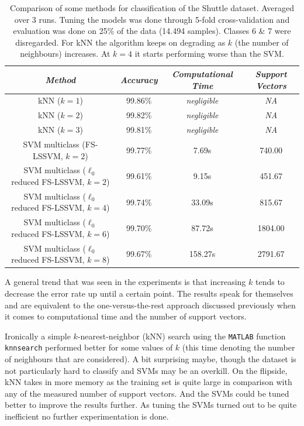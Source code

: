 \begin{table}[htb]
\centering
\begin{tabular}{c|ccc}
\textit{Method} & \textit{Accuracy} & \textit{Computational Time} & \textit{Support Vectors} \\\hline
kNN ($k=1$) & 99.86\% & \textit{negligible} & \textit{NA} \\
kNN ($k=2$) & 99.82\% & \textit{negligible} & \textit{NA} \\
kNN ($k=3$) & 99.81\% & \textit{negligible} & \textit{NA} \\
SVM multiclass (FS-LSSVM, $k=2$) & 99.77\% & 7.69s & 740.00 \\
SVM multiclass ($\ell_0$ reduced FS-LSSVM, $k=2$) & 99.61\% & 9.15s & 451.67 \\
SVM multiclass ($\ell_0$ reduced FS-LSSVM, $k=4$) & 99.74\% & 33.09s & 815.67 \\
SVM multiclass ($\ell_0$ reduced FS-LSSVM, $k=6$) & 99.70\% & 87.72s & 1804.00 \\
SVM multiclass ($\ell_0$ reduced FS-LSSVM, $k=8$) & 99.67\% & 158.27s & 2791.67 \\
\end{tabular}
\caption{Comparison of some methods for classification of the Shuttle dataset. Averaged over 3 runs. Tuning the models was done through 5-fold cross-validation and evaluation was done on 25\% of the data (14.494 samples). Classes 6 \& 7 were disregarded. For kNN the algorithm keeps on degrading as $k$ (the number of neighbours) increases. At $k=4$ it starts performing worse than the SVM.}
\label{shuttlemulticomparison}
\end{table}

A general trend that was seen in the experiments is that increasing $k$ tends to decrease the error rate up until a certain point. The results speak for themselves and are equivalent to the one-versus-the-rest approach discussed previously when it comes to computational time and the number of support vectors.

\par Ironically a simple $k$-nearest-neighbor (kNN) search using the \texttt{MATLAB} function \texttt{knnsearch} performed better for some values of $k$ (this time denoting the number of neighbours that are considered). A bit surprising maybe, though the dataset is not particularly hard to classify and SVMs may be an overkill. On the flipside, kNN takes in more memory as the training set is quite large in comparison with any of the measured number of support vectors. And the SVMs could be tuned better to improve the results further. As tuning the SVMs turned out to be quite inefficient no further experimentation is done.

